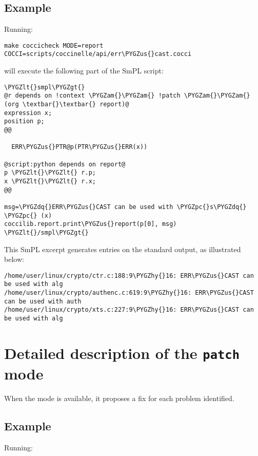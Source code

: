 \documentclass[a4paper,8pt,english]{sphinxmanual}
\def\PYGZus{\char`\_}
\def\PYGZam{\char`\&}
\def\PYGZlt{\char`\<}
\def\PYGZgt{\char`\>}
\def\PYGZpc{\char`\%}
\def\PYGZhy{\char`\-}
\def\PYGZdq{\char`\"}
\begin{document}
\subsection{Example}
\label{dev-tools/coccinelle:example}
Running:

\begin{Verbatim}[commandchars=\\\{\}]
make coccicheck MODE=report COCCI=scripts/coccinelle/api/err\PYGZus{}cast.cocci
\end{Verbatim}

will execute the following part of the SmPL script:

\begin{Verbatim}[commandchars=\\\{\}]
\PYGZlt{}smpl\PYGZgt{}
@r depends on !context \PYGZam{}\PYGZam{} !patch \PYGZam{}\PYGZam{} (org \textbar{}\textbar{} report)@
expression x;
position p;
@@

  ERR\PYGZus{}PTR@p(PTR\PYGZus{}ERR(x))

@script:python depends on report@
p \PYGZlt{}\PYGZlt{} r.p;
x \PYGZlt{}\PYGZlt{} r.x;
@@

msg=\PYGZdq{}ERR\PYGZus{}CAST can be used with \PYGZpc{}s\PYGZdq{} \PYGZpc{} (x)
coccilib.report.print\PYGZus{}report(p[0], msg)
\PYGZlt{}/smpl\PYGZgt{}
\end{Verbatim}

This SmPL excerpt generates entries on the standard output, as
illustrated below:

\begin{Verbatim}[commandchars=\\\{\}]
/home/user/linux/crypto/ctr.c:188:9\PYGZhy{}16: ERR\PYGZus{}CAST can be used with alg
/home/user/linux/crypto/authenc.c:619:9\PYGZhy{}16: ERR\PYGZus{}CAST can be used with auth
/home/user/linux/crypto/xts.c:227:9\PYGZhy{}16: ERR\PYGZus{}CAST can be used with alg
\end{Verbatim}


\section{Detailed description of the \texttt{patch} mode}
\label{dev-tools/coccinelle:detailed-description-of-the-patch-mode}
When the  mode is available, it proposes a fix for each problem
identified.


\subsection{Example}
\label{dev-tools/coccinelle:id1}
Running:
\end{document}
